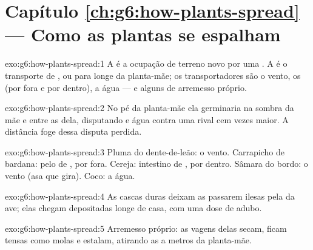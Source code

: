 \section*{Capítulo \ref{ch:g6:how-plants-spread} --- Como as plantas se espalham}

\begin{solution}{exo:g6:how-plants-spread:1}
A  é a ocupação de terreno novo por uma . A
 é o transporte de ,  ou  para longe da
planta-mãe; os transportadores são o vento, os  (por fora e
por dentro), a água --- e alguns  de arremesso próprio.
\end{solution}

\begin{solution}{exo:g6:how-plants-spread:2}
No pé da planta-mãe ela germinaria na sombra da mãe e entre as 
dela, disputando  e água contra uma rival cem vezes maior. A
distância foge dessa disputa perdida.
\end{solution}

\begin{solution}{exo:g6:how-plants-spread:3}
Pluma do dente-de-leão: o vento. Carrapicho de bardana: pelo de
, por fora. Cereja: intestino de , por dentro. Sâmara do
bordo: o vento (asa que gira). Coco: a água.
\end{solution}

\begin{solution}{exo:g6:how-plants-spread:4}
As cascas duras deixam as  passarem ilesas pela  da
ave; elas chegam depositadas longe de casa, com uma dose de adubo.
\end{solution}

\begin{solution}{exo:g6:how-plants-spread:5}
Arremesso próprio: as vagens delas secam, ficam tensas como molas e
estalam, atirando as  a metros da planta-mãe.
\end{solution}

